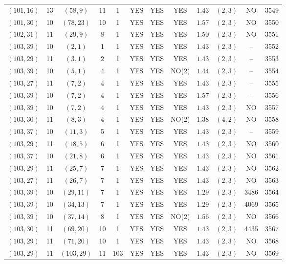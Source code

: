\begin{longtable}{|c|c|c|c|c|c|c|c|c|c|c|c|}
$(101,16)$ & 13 & $(58,9)$ & 11 & 1 & YES & YES & YES & $1.43$ & $(2,3)$ & NO & 3549\\
$(101,30)$ & 10 & $(78,23)$ & 10 & 1 & YES & YES & YES & $1.57$ & $(2,3)$ & NO & 3550\\
$(102,31)$ & 11 & $(29,9)$ & 8 & 1 & YES & YES & YES & $1.50$ & $(2,3)$ & NO & 3551\\
$(103,39)$ & 10 & $(2,1)$ & 1 & 1 & YES & YES & YES & $1.43$ & $(2,3)$ & -- & 3552\\
$(103,29)$ & 11 & $(3,1)$ & 2 & 1 & YES & YES & YES & $1.43$ & $(2,3)$ & -- & 3553\\
$(103,39)$ & 10 & $(5,1)$ & 4 & 1 & YES & YES & NO(2) & $1.44$ & $(2,3)$ & -- & 3554\\
$(103,27)$ & 11 & $(7,2)$ & 4 & 1 & YES & YES & YES & $1.43$ & $(2,3)$ & -- & 3555\\
$(103,39)$ & 10 & $(7,2)$ & 4 & 1 & YES & YES & YES & $1.57$ & $(2,3)$ & -- & 3556\\
$(103,39)$ & 10 & $(7,2)$ & 4 & 1 & YES & YES & YES & $1.43$ & $(2,3)$ & NO & 3557\\
$(103,30)$ & 11 & $(8,3)$ & 4 & 1 & YES & YES & NO(2) & $1.38$ & $(4,2)$ & NO & 3558\\
$(103,37)$ & 10 & $(11,3)$ & 5 & 1 & YES & YES & YES & $1.43$ & $(2,3)$ & -- & 3559\\
$(103,29)$ & 11 & $(18,5)$ & 6 & 1 & YES & YES & YES & $1.43$ & $(2,3)$ & NO & 3560\\
$(103,37)$ & 10 & $(21,8)$ & 6 & 1 & YES & YES & YES & $1.43$ & $(2,3)$ & NO & 3561\\
$(103,29)$ & 11 & $(25,7)$ & 7 & 1 & YES & YES & YES & $1.43$ & $(2,3)$ & NO & 3562\\
$(103,27)$ & 11 & $(26,7)$ & 7 & 1 & YES & YES & YES & $1.43$ & $(2,3)$ & NO & 3563\\
$(103,39)$ & 10 & $(29,11)$ & 7 & 1 & YES & YES & YES & $1.29$ & $(2,3)$ & 3486 & 3564\\
$(103,39)$ & 10 & $(34,13)$ & 7 & 1 & YES & YES & YES & $1.29$ & $(2,3)$ & 4069 & 3565\\
$(103,39)$ & 10 & $(37,14)$ & 8 & 1 & YES & YES & NO(2) & $1.56$ & $(2,3)$ & NO & 3566\\
$(103,30)$ & 11 & $(69,20)$ & 10 & 1 & YES & YES & YES & $1.43$ & $(2,3)$ & 4435 & 3567\\
$(103,29)$ & 11 & $(71,20)$ & 10 & 1 & YES & YES & YES & $1.43$ & $(2,3)$ & NO & 3568\\
$(103,29)$ & 11 & $(103,29)$ & 11 & 103 & YES & YES & YES & $1.43$ & $(2,3)$ & NO & 3569\\

\end{longtable}
